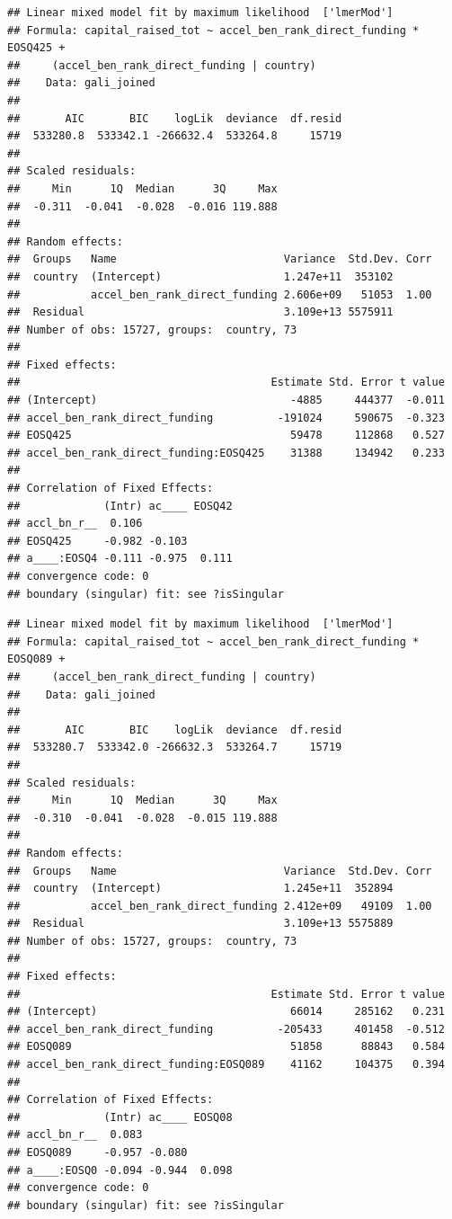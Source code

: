 \documentclass[
  english,
  man]{apa6}
\begin{document}
\begin{verbatim}
## Linear mixed model fit by maximum likelihood  ['lmerMod']
## Formula: capital_raised_tot ~ accel_ben_rank_direct_funding * EOSQ425 +  
##     (accel_ben_rank_direct_funding | country)
##    Data: gali_joined
## 
##       AIC       BIC    logLik  deviance  df.resid 
##  533280.8  533342.1 -266632.4  533264.8     15719 
## 
## Scaled residuals: 
##     Min      1Q  Median      3Q     Max 
##  -0.311  -0.041  -0.028  -0.016 119.888 
## 
## Random effects:
##  Groups   Name                          Variance  Std.Dev. Corr
##  country  (Intercept)                   1.247e+11  353102      
##           accel_ben_rank_direct_funding 2.606e+09   51053  1.00
##  Residual                               3.109e+13 5575911      
## Number of obs: 15727, groups:  country, 73
## 
## Fixed effects:
##                                       Estimate Std. Error t value
## (Intercept)                              -4885     444377  -0.011
## accel_ben_rank_direct_funding          -191024     590675  -0.323
## EOSQ425                                  59478     112868   0.527
## accel_ben_rank_direct_funding:EOSQ425    31388     134942   0.233
## 
## Correlation of Fixed Effects:
##             (Intr) ac____ EOSQ42
## accl_bn_r__  0.106              
## EOSQ425     -0.982 -0.103       
## a____:EOSQ4 -0.111 -0.975  0.111
## convergence code: 0
## boundary (singular) fit: see ?isSingular
\end{verbatim}

\begin{verbatim}
## Linear mixed model fit by maximum likelihood  ['lmerMod']
## Formula: capital_raised_tot ~ accel_ben_rank_direct_funding * EOSQ089 +  
##     (accel_ben_rank_direct_funding | country)
##    Data: gali_joined
## 
##       AIC       BIC    logLik  deviance  df.resid 
##  533280.7  533342.0 -266632.3  533264.7     15719 
## 
## Scaled residuals: 
##     Min      1Q  Median      3Q     Max 
##  -0.310  -0.041  -0.028  -0.015 119.888 
## 
## Random effects:
##  Groups   Name                          Variance  Std.Dev. Corr
##  country  (Intercept)                   1.245e+11  352894      
##           accel_ben_rank_direct_funding 2.412e+09   49109  1.00
##  Residual                               3.109e+13 5575889      
## Number of obs: 15727, groups:  country, 73
## 
## Fixed effects:
##                                       Estimate Std. Error t value
## (Intercept)                              66014     285162   0.231
## accel_ben_rank_direct_funding          -205433     401458  -0.512
## EOSQ089                                  51858      88843   0.584
## accel_ben_rank_direct_funding:EOSQ089    41162     104375   0.394
## 
## Correlation of Fixed Effects:
##             (Intr) ac____ EOSQ08
## accl_bn_r__  0.083              
## EOSQ089     -0.957 -0.080       
## a____:EOSQ0 -0.094 -0.944  0.098
## convergence code: 0
## boundary (singular) fit: see ?isSingular
\end{verbatim}
\end{document}
